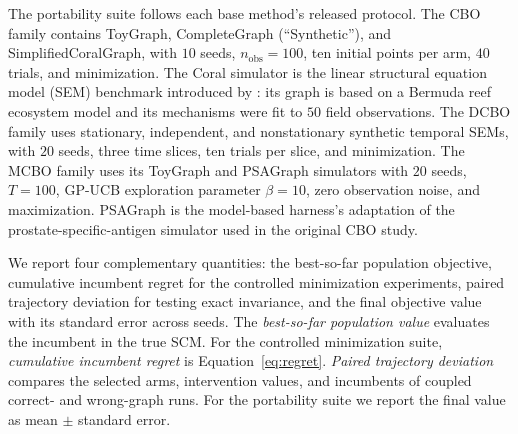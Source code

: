 \documentclass[twoside]{article}
\begin{document}
The portability suite follows each base method's released protocol. The CBO family contains ToyGraph, CompleteGraph (``Synthetic''), and SimplifiedCoralGraph, with $10$ seeds, $n_{\mathrm{obs}}=100$, ten initial points per arm, $40$ trials, and minimization. The Coral simulator is the linear structural equation model (SEM) benchmark introduced by \citet{agliettiCausalBayesianOptimization2020b}: its graph is based on a Bermuda reef ecosystem model and its mechanisms were fit to $50$ field observations. The DCBO family uses stationary, independent, and nonstationary synthetic temporal SEMs, with $20$ seeds, three time slices, ten trials per slice, and minimization. The MCBO family uses its ToyGraph and PSAGraph simulators with $20$ seeds, $T=100$, GP-UCB exploration parameter $\beta=10$, zero observation noise, and maximization. PSAGraph is the model-based harness's adaptation of the prostate-specific-antigen simulator used in the original CBO study.

We report four complementary quantities: the best-so-far population objective, cumulative incumbent regret for the controlled minimization experiments, paired trajectory deviation for testing exact invariance, and the final objective value with its standard error across seeds. The \emph{best-so-far population value} evaluates the incumbent in the true SCM. For the controlled minimization suite, \emph{cumulative incumbent regret} is Equation~\eqref{eq:regret}. \emph{Paired trajectory deviation} compares the selected arms, intervention values, and incumbents of coupled correct- and wrong-graph runs. For the portability suite we report the final value as mean $\pm$ standard error.

\begin{table}[t]
\centering
\caption{Evaluation map. Arrow up for maximization and down for minimization objective give the objective direction.}
\label{tab:experiment-map}
\small
{}
\end{table}
\end{document}
